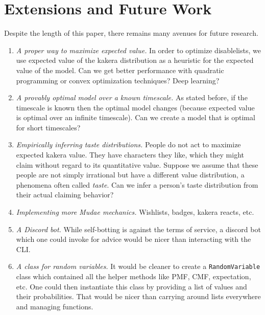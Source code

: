 \documentclass[11pt, oneside]{article}
\theoremstyle{plain}
\theoremstyle{definition}
\begin{document}
\newpage

\section{Extensions and Future Work}
Despite the length of this paper, there
remains many avenues for future research.
\begin{enumerate}
  \item \textit{A proper way to maximize expected value.}
    In order to optimize disablelists, we use expected value of the
    kakera distribution as a heuristic for the expected value of the
    model. Can we get better performance with quadratic programming
    or convex optimization techniques? Deep learning?

  \item \textit{A provably optimal model over a known timescale.}
    As stated before, if the timescale is known then the optimal
    model changes (because expected value is optimal over an infinite
    timescale). Can we create a model that is optimal for short timescales?

  \item \textit{Empirically inferring taste distributions.}
    People do not act to maximize expected kakera value. They have characters
    they like, which they might claim without regard to its quantitative value.
    Suppose we assume that these people are not simply irrational but have a
    different value distribution, a phenomena often called \textit{taste}. Can
    we infer a person's taste distribution from their actual claiming behavior?

  \item \textit{Implementing more Mudae mechanics.}
    Wishlists, badges, kakera reacts, etc.

  \item \textit{A Discord bot.}
    While self-botting is against the terms of service, a discord bot which
    one could invoke for advice would be nicer than interacting with the CLI.

  \item \textit{A class for random variables.}
    It would be cleaner to create a \texttt{RandomVariable} class which
    contained all the helper methods like PMF, CMF, expectation, etc. One
    could then instantiate this class by providing a list of values and
    their probabilities. That would be nicer than carrying around lists
    everywhere and managing functions.
\end{enumerate}
\end{document}
